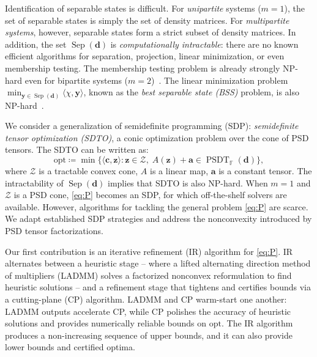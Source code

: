 \documentclass[smallextended]{svjour3}
\newcommand{\F}{\mathbb F}
\newcommand{\cZ}{\mathcal Z}
\DeclareMathOperator{\sep}{Sep}
\DeclareMathOperator{\SOST}{PSDT}
\newcommand{\1}{\mathbf{1}}
\newcommand{\y}{\mathbf{y}}
\newcommand{\z}{\mathbf{z}}
\newcommand{\bc}{\mathbf{c}}
\renewcommand{\a}{\mathbf{a}}
\newcommand{\opt}{\text{opt}}
\newcommand{\NPh}{\textsf{NP}-hard}
\newcommand{\inner}[2]{\langle #1, #2 \rangle}
\newcommand{\vc}[1]{\mathbf{#1}}
\newcommand{\vd}{\vc{d}}
\newcommand{\deq}{\coloneqq}
\begin{document}
Identification of separable states is difficult. For \textit{unipartite} systems ($m=1$), the set of separable states is simply the set of density matrices. For \textit{multipartite systems}, however, separable states form a strict subset of density matrices. In addition, the set \( \sep(\vd) \) is \textit{computationally intractable}: there are no known efficient algorithms for separation, projection, linear minimization, or even membership testing. The membership testing problem is already strongly \NPh{} even for bipartite systems ($m=2$)~\cite{gharibian2008strong}. The linear minimization problem $\min_{\y \in \sep(\vd)} \inner{\chi}{\y}$, known as the \textit{best separable state (BSS)} problem, is also \NPh{}~\cite{fang2021sum}.


We consider a generalization of semidefinite programming (SDP): \textit{semidefinite tensor optimization (SDTO)}, a conic optimization problem over the cone of PSD tensors. The SDTO can be written as:
\begin{equation}
    \label{eq:P}\tag{SDTO}
   \opt \deq \min \{\inner{\bc}{\z}: \z \in \cZ,\;  A(\z) + \a \in  \SOST_{\F}(\vd)\},
\end{equation}
where $\cZ$ is a tractable convex cone, $A$ is a linear map, $\a$ is a constant tensor. The intractability of $\sep(\vd)$ implies that SDTO is also \NPh{}. When $m=1$ and $\cZ$ is a PSD cone, \eqref{eq:P} becomes an SDP, for which off-the-shelf solvers are available. However, algorithms for tackling the general problem \eqref{eq:P} are scarce. We adapt established SDP strategies and address the nonconvexity introduced by PSD tensor factorizations.





Our first contribution is an iterative refinement (IR) algorithm for \eqref{eq:P}. IR alternates between a heuristic stage -- where a lifted alternating direction method of multipliers (LADMM) solves a factorized nonconvex reformulation to find heuristic solutions -- and a refinement stage that tightens and certifies bounds via a cutting-plane (CP) algorithm. LADMM and CP warm-start one another: LADMM outputs accelerate CP, while CP polishes the accuracy of heuristic solutions and provides numerically reliable bounds on $\opt$. The IR algorithm produces a non-increasing sequence of upper bounds, and it can also provide lower bounds and certified optima.
\end{document}
